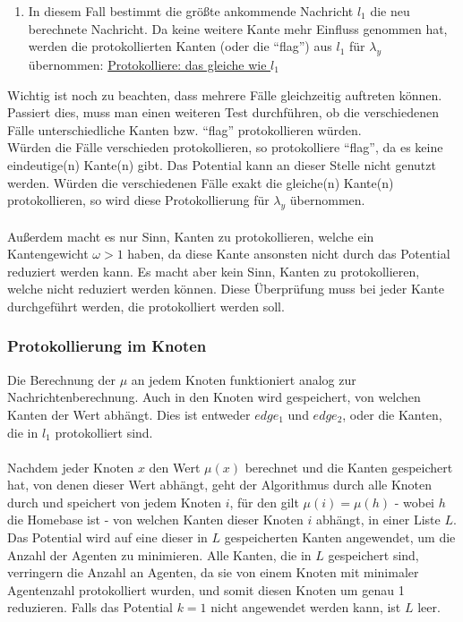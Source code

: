 \begin{enumerate}[label=\alph*)]
	\item In diesem Fall bestimmt die größte ankommende Nachricht $l_{1}$ die neu berechnete Nachricht. Da keine weitere Kante mehr Einfluss genommen hat, werden die protokollierten Kanten (oder die "`flag"') aus $l_{1}$ für $\lambda_{y}$ übernommen: \uline{Protokolliere: das gleiche wie $l_{1}$}
	
\end{enumerate}
Wichtig ist noch zu beachten, dass mehrere Fälle gleichzeitig auftreten können. Passiert dies, muss man einen weiteren Test durchführen, ob die verschiedenen Fälle unterschiedliche Kanten bzw. "`flag"' protokollieren würden.
\\
Würden die Fälle verschieden protokollieren, so protokolliere "`flag"', da es keine eindeutige(n) Kante(n) gibt. Das Potential kann an dieser Stelle nicht genutzt werden. Würden die verschiedenen Fälle exakt die gleiche(n) Kante(n) protokollieren, so wird diese Protokollierung für $\lambda_{y}$ übernommen.
\\
\\
Außerdem macht es nur Sinn, Kanten zu protokollieren, welche ein Kantengewicht $\omega > 1$ haben, da diese Kante ansonsten nicht durch das Potential reduziert werden kann. Es macht aber kein Sinn, Kanten zu protokollieren, welche nicht reduziert werden können. Diese Überprüfung muss bei jeder Kante durchgeführt werden, die protokolliert werden soll.

\subsubsection{Protokollierung im Knoten}

Die Berechnung der $\mu$ an jedem Knoten funktioniert analog zur Nachrichtenberechnung. Auch in den Knoten wird gespeichert, von welchen Kanten der Wert abhängt. Dies ist entweder $edge_{1}$ und $edge_{2}$, oder die Kanten, die in $l_{1}$ protokolliert sind.
\\
\\
Nachdem jeder Knoten $x$ den Wert $\mu(x)$ berechnet und die Kanten gespeichert hat, von denen dieser Wert abhängt, geht der Algorithmus durch alle Knoten durch und speichert von jedem Knoten $i$, für den gilt $\mu(i) = \mu(h)$ - wobei $h$ die Homebase ist - von welchen Kanten dieser Knoten $i$ abhängt, in einer Liste $L$. \\
Das Potential wird auf eine dieser in $L$ gespeicherten Kanten angewendet, um die Anzahl der Agenten zu minimieren. Alle Kanten, die in $L$ gespeichert sind, verringern die Anzahl an Agenten, da sie von einem Knoten mit minimaler Agentenzahl protokolliert wurden, und somit diesen Knoten um genau 1 reduzieren. Falls das Potential $k = 1$ nicht angewendet werden kann, ist $L$ leer.

